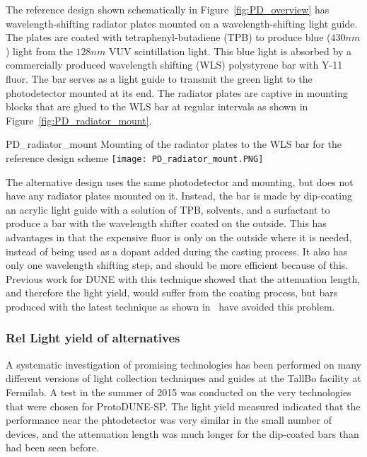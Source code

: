 The reference design shown schematically in Figure~\ref{fig:PD_overview}
has wavelength-shifting radiator plates mounted on a wavelength-shifting light guide.
The plates are coated 
with tetraphenyl-butadiene (TPB) to produce blue ($430nm$) light from the $128nm$ VUV 
scintillation light.  
This blue light is absorbed by a commercially produced wavelength shifting (WLS)
polystyrene bar with Y-11 fluor.  
The bar serves as a light guide to transmit the green light to the photodetector 
mounted at its end.
The radiator plates are captive in mounting blocks that are glued to the WLS bar
at regular intervals as shown in Figure~\ref{fig:PD_radiator_mount}.
\begin{cdrfigure}{PD_radiator_mount}
  {Mounting of the radiator plates to the WLS bar for the reference design scheme}
\texttt{[image: PD\_radiator\_mount.PNG]}
\end{cdrfigure}

The alternative design uses the same photodetector and mounting, but does not have
any radiator plates mounted on it.  
Instead, the bar is made by dip-coating an acrylic light guide with a solution
of TPB, solvents, and a surfactant to produce a bar with the wavelength shifter coated
on the outside.  
This has advantages in that the expensive fluor is only on the outside where it is
needed, instead of being used as a dopant added during the casting process.  
It also has only one wavelength shifting step, and should be more efficient because
of this.  
Previous work for DUNE with this technique showed that the attenuation length, and
therefore the light yield, would suffer from the coating process, but bars produced with
the latest technique as shown in~\cite{conrad_jinst2015} have %
avoided this problem.

\subsubsection{Rel Light yield of alternatives}

A systematic investigation of promising technologies has been performed on 
many different versions of light collection techniques and guides at the 
TallBo facility at Fermilab.
A test in the summer of 2015 was conducted on the very technologies that 
were chosen for ProtoDUNE-SP. \cite{TallBo4} %
The light yield measured indicated that the performance near the phtodetector
was very similar in the small number of devices, and the attenuation length
was much longer for the dip-coated bars than had been seen before. 

